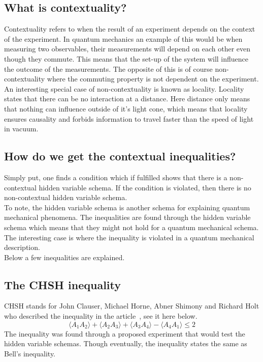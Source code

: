 \documentclass[
  utf8,%
  parskip,%
  largesmallcaps,intlimits,widermath,%
  sharecounter,nobreak,definition=marks,%
  noparts%
]{rtthesis}
\begin{document}
\subsection{What is contextuality?}\label{sec:intro:Background of quantum mechanics:What is contextuality?}
Contextuality refers to when the result of an experiment depends on the context of the experiment. In quantum mechanics an example of this would be when measuring two observables, their measurements will depend on each other even though they commute. This means that the set-up of the system will influence the outcome of the measurements.
The opposite of this is of course non-contextuality where the commuting property is not dependent on the experiment.
An interesting special case of non-contextuality is known as locality. Locality states that there can be no interaction at a distance. Here distance only means that nothing can influence outside of it's light cone, which means that locality ensures causality and forbids information to travel faster than the speed of light in vacuum.
\subsection{How do we get the contextual inequalities?}
Simply put, one finds a condition which if fulfilled shows that there is a non-contextual hidden variable schema. If the condition is violated, then there is no non-contextual hidden variable schema.\\
To note, the hidden variable schema is another schema for explaining quantum mechanical phenomena. The inequalities are found through the hidden variable schema which means that they might not hold for a quantum mechanical schema. The interesting case is where the inequality is violated in a quantum mechanical description.\\
Below a few inequalities are explained.
\subsection{The CHSH inequality}\label{sec:intro:Background of quantum mechanics:The CHSH inequality}
CHSH stands for John Clauser, Michael Horne, Abner Shimony and Richard Holt who described the inequality in the article~\cite{PhysRevLett.23.880}, see it here below.
\begin{equation*}
\langle A_1 A_2 \rangle + \langle A_2 A_3 \rangle + \langle A_3 A_4 \rangle - \langle A_4 A_1 \rangle \leq 2
\end{equation*}
The inequality was found through a proposed experiment that would test the hidden variable schemas. Though eventually, the inequality states the same as Bell's inequality. 
\end{document}
